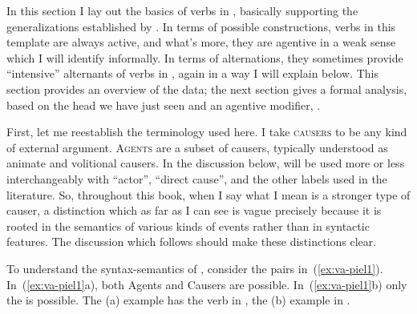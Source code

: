\begin{exe}
\begin{xlist}
\begin{exe}
\begin{xlist}
\begin{exe}
\begin{xlist}
\begin{exe}
\begin{exe}
\begin{xlist}
\begin{exe}
\begin{xlist}
\begin{exe}
\begin{xlist}
\begin{exe}
\begin{xlist}
\begin{exe}
\begin{xlist}
\begin{exe}
\begin{xlist}
\begin{exe}
\begin{xlist}
\begin{exe}
\begin{xlist}
\begin{exe}
\begin{xlist}
\begin{exe}
\begin{xlist}
\begin{exe}
\begin{xlist}
\begin{exe}
\begin{xlist}
\begin{exe}
\begin{xlist}
\begin{exe}
\begin{exe}
\begin{xlist}
\begin{exe}
\begin{xlist}
\begin{exe}
\begin{xlist}
\begin{exe}
\begin{xlist}
{\begin{exe}
\begin{xlist}
\begin{exe}
\begin{xlist}
\begin{exe}
\begin{xlist}
\begin{exe}
\begin{xlist}
\begin{xlist}
\begin{xlist}
\begin{exe}
\begin{xlist}
\begin{xlist}
\begin{xlist}
\begin{exe}
\begin{exe}
\begin{xlist}
In this section I lay out the basics of verbs in {\tpie}, basically supporting the generalizations established by \cite{doron03}. In terms of possible constructions, verbs in this template are always active, and what's more, they are agentive in a weak sense which I will identify informally. In terms of alternations, they sometimes provide ``intensive'' alternants of verbs in {\tkal}, again in a way I will explain below. This section provides an overview of the data; the next section gives a formal analysis, based on the head  we have just seen and an agentive modifier, {\va}.

First, let me reestablish the terminology used here. I take \textsc{causers} to be any kind of external argument. \textsc{Agents} are a subset of causers, typically understood as animate and volitional causers. In the discussion below, \textsc{} will be used more or less interchangeably with ``actor'', ``direct cause'', and the other labels used in the literature. So, throughout this book, when I say \textsc{} what I mean is a stronger type of causer, a distinction which as far as I can see is vague precisely because it is rooted in the semantics of various kinds of events rather than in syntactic features. The discussion which follows should make these distinctions clear.

To understand the syntax-semantics of {\tpie}, consider the pairs in~(\ref{ex:va-piel1}). In~(\ref{ex:va-piel1}a), both Agents and Causers are possible. In~(\ref{ex:va-piel1}b) only the  is possible. The (a) example has the verb in {\tkal}, the (b) example in {\tpie}.


\end{xlist}
\end{exe}
\end{exe}
\end{xlist}
\end{xlist}
\end{xlist}
\end{exe}
\end{xlist}
\end{xlist}
\end{xlist}
\end{exe}
\end{xlist}
\end{exe}
\end{xlist}
\end{exe}
\end{xlist}
\end{exe}}
\end{xlist}
\end{exe}
\end{xlist}
\end{exe}
\end{xlist}
\end{exe}
\end{xlist}
\end{exe}
\end{exe}
\end{xlist}
\end{exe}
\end{xlist}
\end{exe}
\end{xlist}
\end{exe}
\end{xlist}
\end{exe}
\end{xlist}
\end{exe}
\end{xlist}
\end{exe}
\end{xlist}
\end{exe}
\end{xlist}
\end{exe}
\end{xlist}
\end{exe}
\end{xlist}
\end{exe}
\end{xlist}
\end{exe}
\end{xlist}
\end{exe}
\end{xlist}
\end{exe}
\end{exe}
\end{xlist}
\end{exe}
\end{xlist}
\end{exe}
\end{xlist}
\end{exe}
